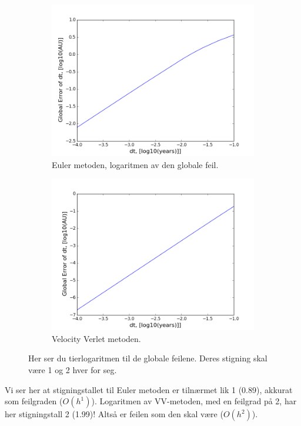 \documentclass[11pt,a4paper]{article}
\begin{document}
\FloatBarrier
\begin{figure}[!ht]
\centering
\begin{subfigure}{.5\textwidth}
  \centering
  \includegraphics[width=1.1\linewidth]{Euler_Global2.png}
  \caption{Euler metoden, logaritmen av den globale feil.}
  \label{1}
\end{subfigure}%
\begin{subfigure}{.5\textwidth}
  \centering
  \includegraphics[width=1.1\linewidth]{Verlet_Global2.png}
  \caption{Velocity Verlet metoden. }
  \label{2}
\end{subfigure}
\caption{Her ser du tierlogaritmen til de globale feilene. Deres stigning skal være 1 og 2 hver for seg.}
\label{fig:duhh}
\end{figure}
\FloatBarrier
Vi ser her at stigningstallet til Euler metoden er tilnærmet lik 1 (0.89), akkurat som feilgraden ($O(h^{1})$). Logaritmen av VV-metoden, med en feilgrad på 2, har her stigningstall 2 (1.99)! Altså er feilen som den skal være  ($O(h^{2})$).
\end{document}
